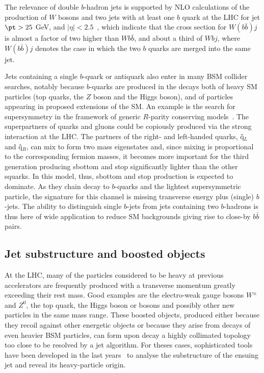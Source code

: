 The relevance of double $b$-hadron jets is supported by NLO calculations of the production of $W$ bosons and two jets with at least one $b$ quark at the LHC for jet $\pt > 25$ GeV, and $|\eta| < 2.5$~\cite{Campbell:2006}, which indicate that the cross section for $W(b\bar{b})j$ is almost a factor of two higher than $Wb\bar{b}$, and about a third of $Wbj$, where  $W(b\bar{b})j$ denotes the case in which the two $b$ quarks are merged into the same jet. 

Jets containing a single $b$-quark or antiquark %
also enter in many BSM collider searches, notably because $b$-quarks are produced in the decays both of heavy SM particles (top quarks, the $Z$ boson and the Higgs boson), and of particles appearing in proposed extensions of the SM.  %
 An example is the search for supersymmetry in the framework of generic $R$-parity conserving models~\cite{ATLAS-CONF-2011-098}. The superpartners of quarks and gluons could be copiously produced via the strong interaction at the LHC. The partners of the right- and left-handed quarks, \~{q}$_{L}$ and  \~{q}$_{R}$, can mix to form two mass eigenstates and, since mixing is proportional to the corresponding fermion masses, it becomes more important for the third generation producing sbottom and stop significantly lighter than the other squarks. In this model, thus, sbottom and stop production is expected to dominate. As they chain decay to $b$-quarks and the lightest supersymmetric particle, the signature for this channel is missing transverse energy %
plus (single) $b$-jets. The ability to distinguish single $b$-jets from jets containing two $b$-hadrons is thus here of wide application to reduce SM backgrounds giving rise to close-by $b\bar{b}$ pairs. %
%
\subsection{Jet substructure and boosted objects}
At the LHC, many of the particles considered to be heavy at previous accelerators are frequently produced with a transverse momentum greatly exceeding their rest mass. Good examples are the electro-weak gauge bosons $W^\pm$ and $Z^0$, the top quark, the Higgs boson or bosons and possibly other new particles in the same mass range. These boosted objects, produced either because they recoil against other energetic objects or because they arise from decays of even heavier BSM particles, can form upon decay a highly collimated topology too close to be resolved by a jet algorithm. For theses cases, sophisticated tools have been developed in the last years~\cite{jet_substruct} to analyse the substructure of the ensuing jet and reveal its heavy-particle origin.

